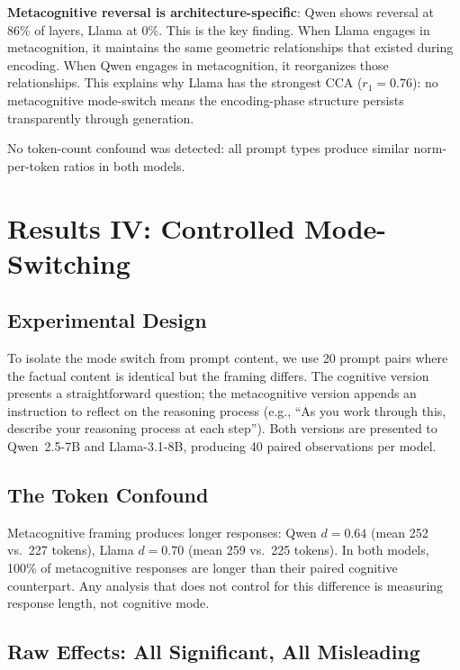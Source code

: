 \documentclass[11pt,a4paper]{article}
\begin{document}
\textbf{Metacognitive reversal is architecture-specific}: Qwen shows reversal at 86\% of layers, Llama at 0\%. This is the key finding. When Llama engages in metacognition, it maintains the same geometric relationships that existed during encoding. When Qwen engages in metacognition, it reorganizes those relationships. This explains why Llama has the strongest CCA ($r_1 = 0.76$): no metacognitive mode-switch means the encoding-phase structure persists transparently through generation.

No token-count confound was detected: all prompt types produce similar norm-per-token ratios in both models.

\section{Results IV: Controlled Mode-Switching}

\subsection{Experimental Design}

To isolate the mode switch from prompt content, we use 20 prompt pairs where the factual content is identical but the framing differs. The cognitive version presents a straightforward question; the metacognitive version appends an instruction to reflect on the reasoning process (e.g., ``As you work through this, describe your reasoning process at each step''). Both versions are presented to Qwen~2.5-7B and Llama-3.1-8B, producing 40 paired observations per model.

\subsection{The Token Confound}

Metacognitive framing produces longer responses: Qwen $d = 0.64$ (mean 252 vs.\ 227 tokens), Llama $d = 0.70$ (mean 259 vs.\ 225 tokens). In both models, 100\% of metacognitive responses are longer than their paired cognitive counterpart. Any analysis that does not control for this difference is measuring response length, not cognitive mode.

\subsection{Raw Effects: All Significant, All Misleading}
\end{document}
